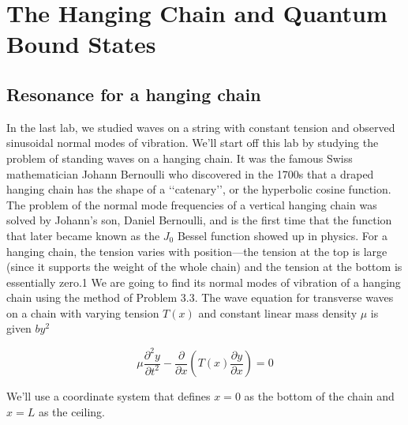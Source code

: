 
\chapter*{The Hanging Chain and Quantum Bound States}
\section*{Resonance for a hanging chain}

In the last lab, we studied waves on a string with constant tension and observed
sinusoidal normal modes of vibration. We\rq ll start off this lab by studying the
problem of standing waves on a hanging chain. It was the famous Swiss mathematician Johann Bernoulli who discovered in the 1700s that a draped hanging
chain has the shape of a \lq\lq catenary\rq\rq, or the hyperbolic cosine function. The problem of the normal mode frequencies of a vertical hanging chain was solved by
Johann\rq s son, Daniel Bernoulli, and is the first time that the function that later
became known as the $J_0$ Bessel function showed up in physics.
For a hanging chain, the tension varies with position—the tension at the top
is large (since it supports the weight of the whole chain) and the tension at the
bottom is essentially zero.1 We are going to find its normal modes of vibration of a
hanging chain using the method of Problem 3.3. The wave equation for transverse
waves on a chain with varying tension $T (x)$ and constant linear mass density $\mu$ is
given $by^2$

\begin{equation}\label{eq:41}
		\mu \frac{\partial^2 y}{\partial t^2} - \frac{\partial}{\partial x}(T(x)\frac{\partial y}{\partial x}) = 0
				\end{equation}
				
		We\rq ll use a coordinate system that defines $x = 0$ as the bottom of the chain and
$x = L$ as the ceiling.		

